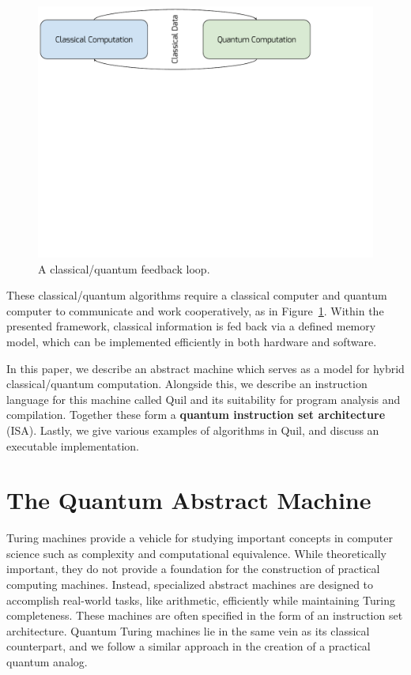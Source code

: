 \documentclass[conference]{IEEEtran}
\newcommand{\defn}[1]{\textbf{#1}}
\begin{document}
\begin{figure}[t]
    \centering
    \includegraphics[scale=0.5]{classical-quantum.pdf}
    \caption{A classical/quantum feedback loop.}
    \label{fig:classical-quantum-feedback}
\end{figure}

These classical/quantum algorithms require a classical computer and quantum computer to communicate and work cooperatively, as in Figure~\ref{fig:classical-quantum-feedback}. Within the presented framework, classical information is fed back via a defined memory model, which can be implemented efficiently in both hardware and software.

In this paper, we describe an abstract machine which serves as a model for hybrid classical/quantum computation. Alongside this, we describe an instruction language for this machine called Quil and its suitability for program analysis and compilation. Together these form a \defn{quantum instruction set architecture} (ISA). Lastly, we give various examples of algorithms in Quil, and discuss an executable implementation.

\section{The Quantum Abstract Machine}\label{sec:qam}
Turing machines provide a vehicle for studying important concepts in computer science such as complexity and computational equivalence. While theoretically important, they do not provide a foundation for the construction of practical computing machines. Instead, specialized abstract machines are designed to accomplish real-world tasks, like arithmetic, efficiently while maintaining Turing completeness. These machines are often specified in the form of an instruction set architecture. Quantum Turing machines lie in the same vein as its classical counterpart, and we follow a similar approach in the creation of a practical quantum analog.
\end{document}

